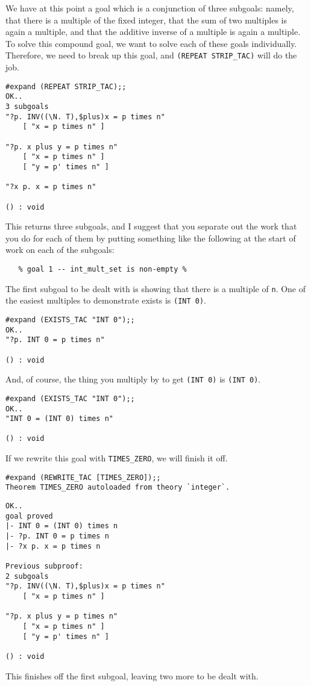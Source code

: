 We have at this point a goal which is a conjunction of three subgoals:
namely, that there is a multiple of the fixed integer, that the sum of
two multiples is again a multiple, and that the additive inverse of a
multiple is again a multiple.  To solve this compound goal, we want to
solve each of these goals individually.  Therefore, we need to break up
this goal, and {\small\verb+(REPEAT STRIP_TAC)+} will do the job.
\begin{session}
\begin{verbatim}
#expand (REPEAT STRIP_TAC);;
OK..
3 subgoals
"?p. INV((\N. T),$plus)x = p times n"
    [ "x = p times n" ]

"?p. x plus y = p times n"
    [ "x = p times n" ]
    [ "y = p' times n" ]

"?x p. x = p times n"

() : void
\end{verbatim}
\end{session}

This returns three subgoals, and I suggest that you separate out the
work that you do for each of them by putting something like the
following at the start of work on each of the subgoals:
\begin{verbatim}
   % goal 1 -- int_mult_set is non-empty %
\end{verbatim}

The first subgoal to be dealt with is showing that there is a multiple
of {\small\tt n}.  One of the easiest multiples to demonstrate exists is
{\small\verb+(INT 0)+}.
\begin{session}
\begin{verbatim}
#expand (EXISTS_TAC "INT 0");;
OK..
"?p. INT 0 = p times n"

() : void
\end{verbatim}
\end{session}
And, of course, the thing you multiply by to get
{\small\verb+(INT 0)+} is {\small\verb+(INT 0)+}.
\begin{session}
\begin{verbatim}
#expand (EXISTS_TAC "INT 0");;
OK..
"INT 0 = (INT 0) times n"

() : void
\end{verbatim}
\end{session}
If we rewrite this goal with {\small\verb+TIMES_ZERO+}, we will
finish it off.
\begin{session}
\begin{verbatim}
#expand (REWRITE_TAC [TIMES_ZERO]);;
Theorem TIMES_ZERO autoloaded from theory `integer`.
\end{verbatim}
\mvdots
\begin{verbatim}
OK..
goal proved
|- INT 0 = (INT 0) times n
|- ?p. INT 0 = p times n
|- ?x p. x = p times n

Previous subproof:
2 subgoals
"?p. INV((\N. T),$plus)x = p times n"
    [ "x = p times n" ]

"?p. x plus y = p times n"
    [ "x = p times n" ]
    [ "y = p' times n" ]

() : void
\end{verbatim}
\end{session}
This finishes off the first subgoal, leaving two more to be dealt
with.

